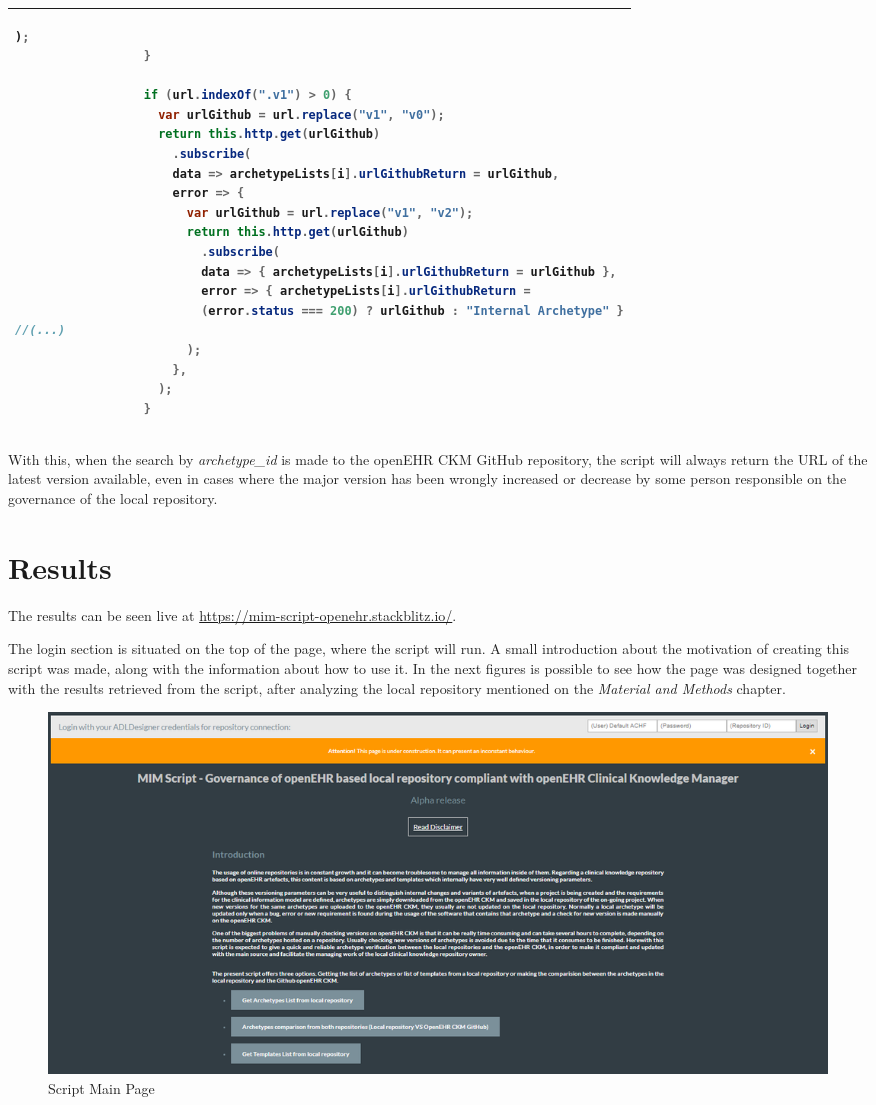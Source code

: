 \documentclass[mim_thesis.tex]{subfiles}
\begin{document}
\begin{table}[H]
\begin{tabular}{l}
\begin{lstlisting}[language=java]
                      );
                  }
                  
                  if (url.indexOf(".v1") > 0) {
                    var urlGithub = url.replace("v1", "v0");
                    return this.http.get(urlGithub)
                      .subscribe(
                      data => archetypeLists[i].urlGithubReturn = urlGithub,
                      error => {
                        var urlGithub = url.replace("v1", "v2");
                        return this.http.get(urlGithub)
                          .subscribe(
                          data => { archetypeLists[i].urlGithubReturn = urlGithub },
                          error => { archetypeLists[i].urlGithubReturn = 
                          (error.status === 200) ? urlGithub : "Internal Archetype" }
//(...)
                        );
                      },
                    );
                  }
\end{lstlisting}
\tabularnewline \bottomrule[2pt]
\end{tabular}
\end{table}

With this, when the search by \textit{archetype\_id} is made to the openEHR CKM GitHub repository, the script will always return the URL of the latest version available, even in cases where the major version has been wrongly increased or decrease by some person responsible on the governance of the local repository. 


\section{Results}

The results can be seen live at \url{https://mim-script-openehr.stackblitz.io/}.

The login section is situated on the top of the page, where the script will run. A small introduction about the motivation of creating this script was made, along with the information about how to use it. In the next figures is possible to see how the page was designed together with the results retrieved from the script, after analyzing the local repository mentioned on the \textit{Material and Methods} chapter. 

\begin{figure}[H]
	\centering
    \includegraphics[width=1\textwidth]{img/script_main_page.PNG}
	\caption{Script Main Page }
	\label{fig:script_main_page}
\end{figure}
\end{document}

